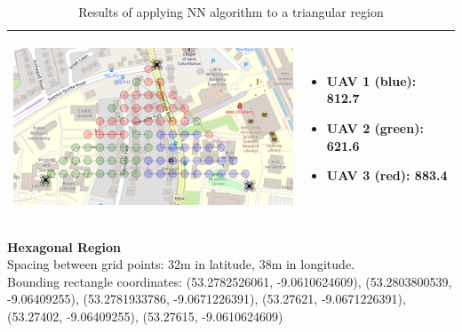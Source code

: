 \begin{table}[h!]
\begin{tabular}{ | c | m{5cm} | }
    \begin{minipage}[c][57mm][c]{.6\textwidth}
      \includegraphics[width=\linewidth, height=55mm]{Chapters/MultiAgentCoverage/MultipleTravellingSalesman/Figs/Triangle/ThreeRAV.PNG}
    \end{minipage}
    &
    \begin{itemize}[leftmargin=*]
    \item[] UAV 1 (blue): 812.7
    \item[] UAV 2 (green): 621.6
    \item[] UAV 3 (red): 883.4
    \end{itemize}
    \\
    \hline
  \end{tabular}
  \caption{Results of applying NN algorithm to a triangular region}\label{table:NNAlgoResultsTri}
\end{table}


\textbf{Hexagonal Region}
\\Spacing between grid points: 32m in latitude, 38m in longitude.
\\Bounding rectangle coordinates: (53.2782526061, -9.0610624609), (53.2803800539, -9.06409255), (53.2781933786, -9.0671226391), (53.27621, -9.0671226391), (53.27402, -9.06409255), (53.27615, -9.0610624609)
\\


